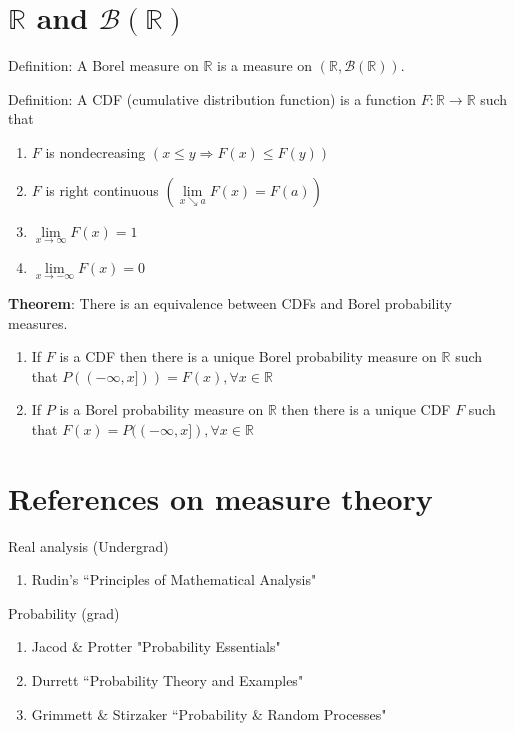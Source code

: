 \documentclass[12pt]{article}
\newcommand{\B}{\mathcal{B}}
\begin{document}
\section {$\mathbb{R}$ and $\B(\mathbb{R})$}

Definition: A Borel measure on $\mathbb{R}$ is a measure on $(\mathbb{R},\B(\mathbb{R}))$.

Definition: A CDF (cumulative distribution function) is a function $F:\mathbb{R}\rightarrow\mathbb{R}$
such that 
\begin{enumerate}
    \item $F$ is nondecreasing $(x\le y \Rightarrow F(x)\le F(y))$
    \item $F$ is right continuous $(\lim\limits_{x\searrow a} F(x)=F(a))$
    \item $\lim\limits_{x\rightarrow\infty} F(x)=1$
    \item $\lim\limits_{x\rightarrow -\infty} F(x)=0$
\end{enumerate}

\bigbreak
\textbf{Theorem}: There is an equivalence between CDFs and Borel probability measures.

\begin{enumerate}
    \item If $F$ is a CDF then there is a unique Borel probability measure on $\mathbb{R}$
such that $P((-\infty,x]))=F(x), \forall x\in\mathbb{R}$

\item If $P$ is a Borel probability measure on $\mathbb{R}$ then there is a unique CDF $F$ such
that $F(x)=P((-\infty,x]), \forall x\in\mathbb{R}$

\end{enumerate}

\section{References on measure theory}

Real analysis (Undergrad)
\begin{enumerate}
\item Rudin's ``Principles of Mathematical Analysis"
\end{enumerate}

Probability (grad)

\begin{enumerate}
    \item Jacod \& Protter "Probability Essentials"
    \item Durrett ``Probability Theory and Examples"
    \item Grimmett \& Stirzaker ``Probability \& Random Processes"
\end{enumerate}
\end{document}
